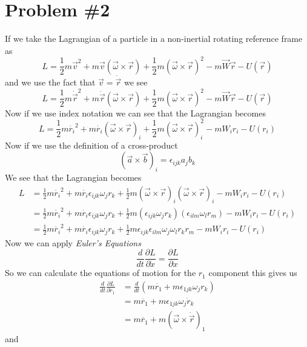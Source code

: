 \documentclass[11pt]{article}
\numberwithin{equation}{section}
\begin{document}
\section{Problem \#2}
If we take the Lagrangian of a particle in a non-inertial rotating reference frame as
$$L = \frac{1}{2}m\vec{v}^2+m\vec{v}\left(\vec{\omega}\times\vec{r}\right)+\frac{1}{2}m\left(\vec{\omega}\times\vec{r}\right)^2-m\vec{W}\vec{r}-U(\vec{r})$$
and we use the fact that $\vec{v} = \dot{\vec{r}}$ we see
$$L = \frac{1}{2}m\dot{\vec{r}}^2+m\dot{\vec{r}}\left(\vec{\omega}\times\vec{r}\right)+\frac{1}{2}m\left(\vec{\omega}\times\vec{r}\right)^2-m\vec{W}\vec{r}-U(\vec{r})$$
Now if we use index notation we can see that the Lagrangian becomes
$$L = \frac{1}{2}m\dot{r_i}^2+m\dot{r_i}\left(\vec{\omega}\times\vec{r}\right)_i+\frac{1}{2}m\left(\vec{\omega}\times\vec{r}\right)_i^2-mW_ir_i-U(r_i)$$
Now if we use the definition of a cross-product
\begin{equation}
(\vec{a}\times\vec{b})_i = \epsilon_{ijk}a_jb_k
\label{crossprod}
\end{equation}
We see that the Lagrangian becomes
\begin{align*}
L &= \frac{1}{2}m\dot{r_i}^2+m\dot{r_i}\epsilon_{ijk}\omega_jr_k+\frac{1}{2}m\left(\vec{\omega}\times\vec{r}\right)_i\left(\vec{\omega}\times\vec{r}\right)_i-mW_ir_i-U(r_i)\\
 &= \frac{1}{2}m\dot{r_i}^2+m\dot{r_i}\epsilon_{ijk}\omega_jr_k+\frac{1}{2}m(\epsilon_{ijk}\omega_jr_k)(\epsilon_{ilm}\omega_lr_m)-mW_ir_i-U(r_i)\\
 &= \frac{1}{2}m\dot{r_i}^2+m\dot{r_i}\epsilon_{ijk}\omega_jr_k+\frac{1}{2}m\epsilon_{ijk}\epsilon_{ilm}\omega_j\omega_lr_kr_m-mW_ir_i-U(r_i)
\end{align*}
Now we can apply \emph{Euler's Equations}
\begin{equation}
\frac{d}{dt}\frac{\partial L}{\partial \dot{x}} = \frac{\partial L}{\partial x} 
\label{eulereq}
\end{equation}
So we can calculate the equations of motion for the $r_1$ component this gives us
\begin{align*}
\frac{d}{dt}\frac{\partial L}{\partial \dot{r}_1} &= \frac{d}{dt}\left(m\dot{r_1}+m\epsilon_{1jk}\omega_jr_k\right)\\
&= m\ddot{r_1}+m\epsilon_{1jk}\omega_j\dot{r}_k\\
&= m\ddot{r_1}+m\left(\vec{\omega}\times\dot{\vec{r}}\right)_1
\end{align*}
and
\end{document}
